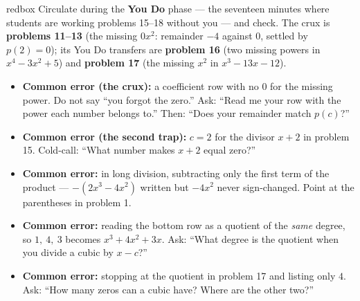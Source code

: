 \documentclass[10pt]{article}
\begin{document}
\begin{skillbox}{redbox}
Circulate during the \textbf{You Do} phase --- the seventeen minutes where students are working
problems 15--18 without you --- and check. The crux is \textbf{problems 11--13} (the missing
$0x^2$: remainder $-4$ against $0$, settled by $p(2) = 0$); its You Do transfers are
\textbf{problem 16} (two missing powers in $x^4 - 3x^2 + 5$) and \textbf{problem 17} (the
missing $x^2$ in $x^3 - 13x - 12$).
\begin{itemize}
  \item \textbf{Common error (the crux):} a coefficient row with no $0$ for the missing power.
        Do not say ``you forgot the zero.'' Ask: ``Read me your row with the power each number
        belongs to.'' Then: ``Does your remainder match $p(c)$?''
  \item \textbf{Common error (the second trap):} $c = 2$ for the divisor $x + 2$ in problem 15.
        Cold-call: ``What number makes $x + 2$ equal zero?''
  \item \textbf{Common error:} in long division, subtracting only the first term of the
        product --- $-(2x^3 - 4x^2)$ written but $-4x^2$ never sign-changed. Point at the
        parentheses in problem 1.
  \item \textbf{Common error:} reading the bottom row as a quotient of the \emph{same} degree,
        so $1,\ 4,\ 3$ becomes $x^3 + 4x^2 + 3x$. Ask: ``What degree is the quotient when you
        divide a cubic by $x - c$?''
  \item \textbf{Common error:} stopping at the quotient in problem 17 and listing only $4$.
        Ask: ``How many zeros can a cubic have? Where are the other two?''
\end{itemize}
\end{skillbox}
\end{document}
